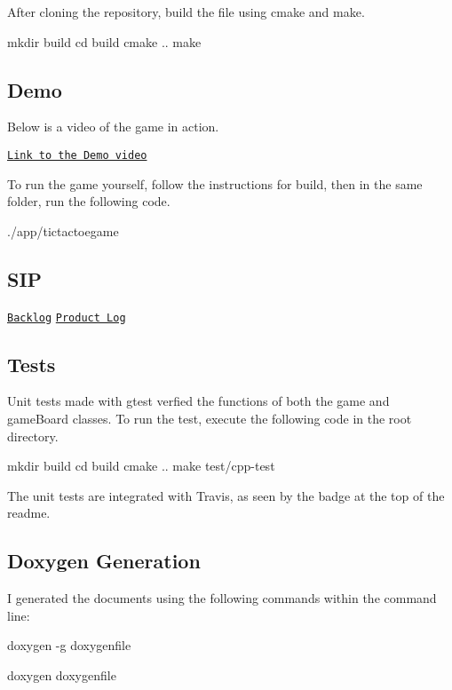 After cloning the repository, build the file using cmake and make.

mkdir build cd build cmake .. make

\subsection*{Demo}

Below is a video of the game in action.

\href{https://drive.google.com/open?id=0BxfrmvtnmsrXdmNpLXRlMXR1T3M}{\tt Link to the Demo video}

To run the game yourself, follow the instructions for build, then in the same folder, run the following code.

./app/tictactoegame

\subsection*{S\-I\-P}

\href{https://drive.google.com/open?id=1KFQ9Ns8AJOG_RbMY5DaGz2tUdGVuaAmlSZTdXr1TY-M}{\tt Backlog} \href{https://docs.google.com/spreadsheets/d/1cvphMVsGHO1l1VFnBONkp5L9tVWFDhlSldkhnq5PvsM/edit?usp=sharing}{\tt Product Log}

\subsection*{Tests}

Unit tests made with gtest verfied the functions of both the game and game\-Board classes. To run the test, execute the following code in the root directory.

mkdir build cd build cmake .. make test/cpp-\/test

The unit tests are integrated with Travis, as seen by the badge at the top of the readme.

\subsection*{Doxygen Generation}

I generated the documents using the following commands within the command line\-:

doxygen -\/g doxygenfile

doxygen doxygenfile 